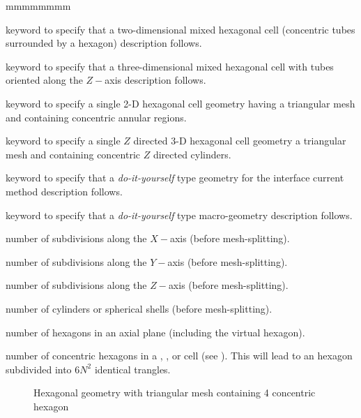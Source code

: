 \begin{ListeDeDescription}{mmmmmmmm}
\item[\moc{HEXCEL}] keyword to specify that a two-dimensional mixed hexagonal cell (concentric tubes surrounded by a hexagon) description follows.

\item[\moc{HEXCELZ}] keyword to specify that a three-dimensional mixed hexagonal cell with tubes oriented along the $Z-$axis description follows.

\item[\moc{HEXTCEL}] keyword to specify a single 2-D hexagonal cell geometry having a triangular mesh and containing concentric annular regions.

\item[\moc{HEXTCELZ}] keyword to specify a single $Z$ directed 3-D hexagonal cell geometry a triangular mesh and containing concentric $Z$ directed cylinders. 

\item[\moc{GROUP}] keyword to specify that a {\sl do-it-yourself} type geometry for the interface current method
description follows.

\item[\moc{MACRO}] keyword to specify that a {\sl do-it-yourself} type macro-geometry
description follows.

\item[\dusa{lx}] number of subdivisions along the $X-$axis (before
mesh-splitting).

\item[\dusa{ly}] number of subdivisions along the $Y-$axis (before
mesh-splitting).

\item[\dusa{lz}] number of subdivisions along the $Z-$axis (before
mesh-splitting).

\item[\dusa{lr}] number of cylinders or spherical shells (before
mesh-splitting).

\item[\dusa{lh}] number of hexagons in an axial plane (including the virtual
hexagon).

\item[\dusa{nhr}] number of concentric hexagons in a , ,  or   cell (see ). This will lead to an hexagon subdivided into $6N^{2}$ identical trangles.

\begin{figure}[h!]  
\begin{center} 
\parbox{9.0cm}{\epsfxsize=9cm }
\parbox{14cm}{\caption{Hexagonal geometry with triangular mesh containing 4 concentric hexagon}\label{fig:GeoHEXT4}}   
\end{center}  
\end{figure}


\end{ListeDeDescription}
